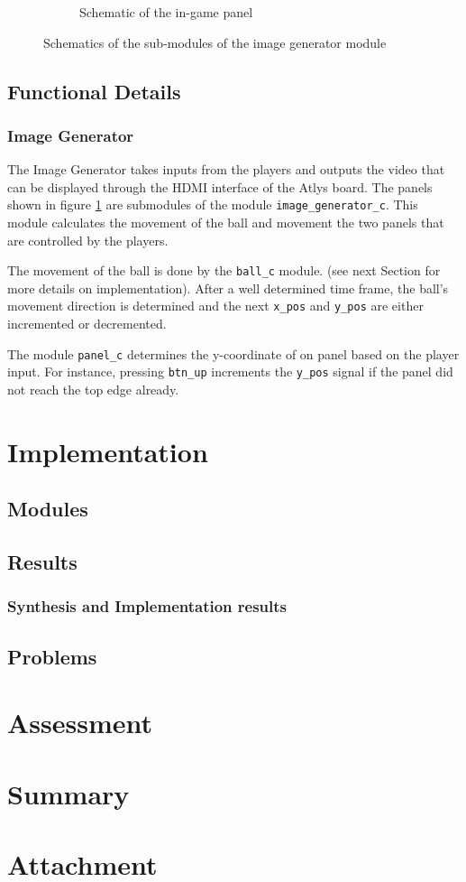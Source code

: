 \documentclass[12pt]{article}
\begin{document}
\begin{figure}[h]
\begin{subfigure}[b]{.4\textwidth}
			\caption{Schematic of the in-game panel}
		\end{subfigure}
		
	\caption{Schematics of the sub-modules of the image generator module}
	\label{ball_wall_panel}
	\end{figure}
	
	\newpage	
	\subsection{Functional Details}
		\subsubsection{Image Generator}
		The Image Generator takes inputs from the players and outputs the video that can be displayed through the HDMI interface of the Atlys board. The panels shown in figure \ref{ball_wall_panel} are submodules of the module \texttt{image\_generator\_c}.
		This module calculates the movement of the ball and movement the two panels that are controlled by the players. 
		
		The movement of the ball is done by the \texttt{ball\_c} module. (see next Section for more details on implementation).
		After a well determined time frame, the ball's movement direction is determined and the next \texttt{x\_pos} and \texttt{y\_pos} are either incremented or decremented. 
		
		The module \texttt{panel\_c} determines the y-coordinate of on panel based on the player input. For instance, pressing \texttt{btn\_up} increments the \texttt{y\_pos} signal if the panel did not reach the top edge already. 
		  
	
\newpage
\section{Implementation}
	\subsection{Modules}
	\subsection{Results}
		\subsubsection{Synthesis and Implementation results}
	\subsection{Problems}

\newpage
\section{Assessment}

\newpage
\section{Summary}

\newpage
\section{Attachment}
\end{document}
